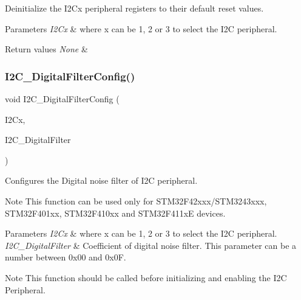 Deinitialize the I2\+Cx peripheral registers to their default reset values. 


\begin{DoxyParams}{Parameters}
{\em I2\+Cx} & where x can be 1, 2 or 3 to select the I2C peripheral. \\
\hline
\end{DoxyParams}

\begin{DoxyRetVals}{Return values}
{\em None} & \\
\hline
\end{DoxyRetVals}
\mbox{\label{group___i2_c___group1_ga90b0815858cc14266d2957495fd7e105}} 
\subsubsection{\texorpdfstring{I2\+C\+\_\+\+Digital\+Filter\+Config()}{I2C\_DigitalFilterConfig()}}
{\footnotesize\ttfamily void I2\+C\+\_\+\+Digital\+Filter\+Config (\begin{DoxyParamCaption}\item[{I2\+C\+\_\+\+Type\+Def $\ast$}]{I2\+Cx,  }\item[{uint16\+\_\+t}]{I2\+C\+\_\+\+Digital\+Filter }\end{DoxyParamCaption})}



Configures the Digital noise filter of I2C peripheral. 

\begin{DoxyNote}{Note}
This function can be used only for S\+T\+M32\+F42xxx/\+S\+T\+M3243xxx, S\+T\+M32\+F401xx, S\+T\+M32\+F410xx and S\+T\+M32\+F411xE devices.
\end{DoxyNote}

\begin{DoxyParams}{Parameters}
{\em I2\+Cx} & where x can be 1, 2 or 3 to select the I2C peripheral. \\
\hline
{\em I2\+C\+\_\+\+Digital\+Filter} & Coefficient of digital noise filter. This parameter can be a number between 0x00 and 0x0F. \\
\hline
\end{DoxyParams}
\begin{DoxyNote}{Note}
This function should be called before initializing and enabling the I2C Peripheral. 
\end{DoxyNote}

